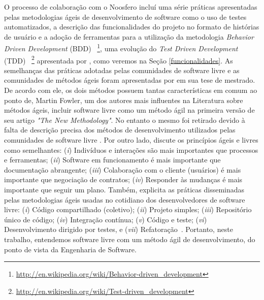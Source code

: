 O processo de colaboração com o Noosfero incluí uma série práticas apresentadas
pelas metodologias ágeis de desenvolvimento de software como o uso de testes
automatizados, a descrição das funcionalidades do projeto no formato de
histórias de usuário e a adoção de ferramentas para a utilização da metodologia
\textit{Behavior Driven Development} (BDD)%
~\footnote{\url{http://en.wikipedia.org/wiki/Behavior-driven_development}},
uma evolução do \textit{Test Driven Development} (TDD)%
~\footnote{\url{http://en.wikipedia.org/wiki/Test-driven_development}}
apresentada por , como veremos na Seção
\ref{funcionalidades}.
%
As semelhanças das práticas adotadas pelas comunidades de software livre e as
comunidades de métodos ágeis foram apresentadas por 
em sua tese de mestrado. De acordo com ele, os dois
métodos possuem tantas características em comum ao ponto de, Martin Fowler,
um dos autores mais influentes na Literatura sobre métodos ágeis,
incluir software livre como um método ágil na primeira versão de seu artigo
\textit{"The New Methodology"}. No entanto o mesmo foi retirado devido
à falta de descrição precisa dos métodos de desenvolvimento utilizados pelas
comunidades de software livre .
%
Por outro lado,  discute os princípios ágeis e livres
como semelhantes:
%
(\textit{i}) Indivíduos e interações são mais importantes que processos e
ferramentas;
(\textit{ii}) Software em funcionamento é mais importante que documentação
abrangente;
(\textit{iii}) Colaboração com o cliente (usuários) é mais importante que
negociação de contratos;
(\textit{iv}) Responder às mudanças é mais importante que seguir um plano.
%
Também, explicita as práticas disseminadas pelas metodologias ágeis usadas no
cotidiano dos desenvolvedores de software livre:
(\textit{i}) Código compartilhado (coletivo);
(\textit{ii}) Projeto simples;
(\textit{iii}) Repositório único de código;
(\textit{iv}) Integração contínua;
(\textit{v}) Código e teste;
(\textit{vi}) Desenvolvimento dirigido por testes, e
(\textit{vii}) Refatoração~\cite{corbucci2011}. Portanto, neste trabalho,
entendemos software livre com um método ágil de desenvolvimento, do ponto de
vista da Engenharia de Software.





